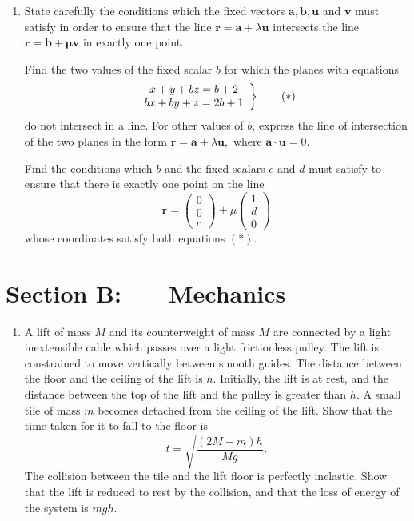 \documentclass[a4, 11pt]{report}
\newlength{\qspace}
\newcounter{qnumber}
\newenvironment{question}%
 {\vspace{\qspace}
  \begin{enumerate}[\bfseries 1\quad][10]%
    \setcounter{enumi}{\value{qnumber}}%
    \item%
 }
{
  \end{enumerate}
  \filbreak
  \stepcounter{qnumber}
 }
\begin{document}
	
\begin{question}
State carefully the conditions which the fixed vectors $\mathbf{a,b,u}$
and $\mathbf{v}$ must satisfy in order to ensure that the line $\mathbf{r=a+}\lambda\mathbf{u}$
intersects the line $\mathbf{r=b+\mu}\mathbf{v}$ in exactly one point. 


Find the two values of the fixed scalar $b$ for which the planes
with equations 
\[
\left.\begin{array}{c}
x+y+bz=b+2\\
bx+by+z=2b+1
\end{array}\right\} \tag{\ensuremath{*}}
\]
do not intersect in a line. For other values of $b$, express the
line of intersection of the two planes in the form $\mathbf{r=a}+\lambda\mathbf{u},$
where $\mathbf{a\cdot u}=0$. 


Find the conditions which $b$ and the fixed scalars $c$ and $d$
must satisfy to ensure that there is exactly one point on the line
\[
\mathbf{r=}\left(\begin{array}{c}
0\\
0\\
c
\end{array}\right)+\mu\left(\begin{array}{c}
1\\
d\\
0
\end{array}\right)
\]
whose coordinates satisfy both equations $(*)$. 
			\end{question}
			
		
		
		
	
\newpage
\section*{Section B: \ \ \ Mechanics}


	
\begin{question}
	A lift of mass $M$ and its counterweight of mass $M$ are connected
	by a light inextensible cable which passes over a light frictionless
	pulley. The lift is constrained to move vertically between smooth
	guides. The distance between the floor and the ceiling of the lift
	is $h$. Initially, the lift is at rest, and the distance between
	the top of the lift and the pulley is greater than $h$. A small tile
	of mass $m$ becomes detached from the ceiling of the lift. Show that
	the time taken for it to fall to the floor is 
	\[
	t=\sqrt{\frac{\left(2M-m\right)h}{Mg}}.
	\]
	The collision between the tile and the lift floor is perfectly inelastic.
	Show that the lift is reduced to rest by the collision, and that the
	loss of energy of the system is $mgh$.

	\end{question}
	
\end{document}
